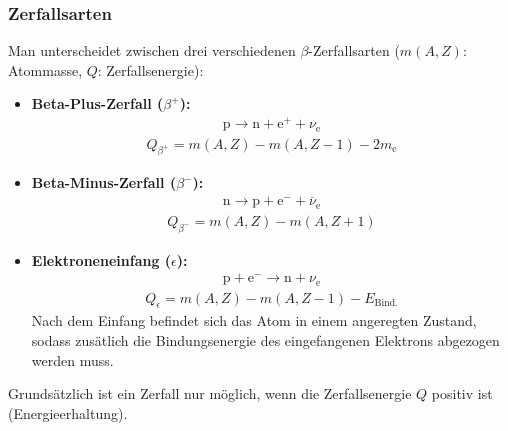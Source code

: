 \documentclass[11pt, a4paper]{article}
\numberwithin{equation}{section}
\begin{document}
\subsubsection{Zerfallsarten}
Man unterscheidet zwischen drei verschiedenen $\beta$-Zerfallsarten ($m(A,Z)$: Atommasse, $Q$: Zerfallsenergie):
\begin{itemize}
	\item \textbf{Beta-Plus-Zerfall ($\beta^+$):}
	\begin{align}
	\mathrm{p} \to \mathrm{n} + \mathrm{e}^+ + \nu_\mathrm{e}
	\end{align}
	\begin{align}
		Q_{\beta^+} = m( A, Z ) - m( A, Z - 1) - 2 m_\mathrm{e}
	\end{align}
	
	\item \textbf{Beta-Minus-Zerfall ($\beta^-$):}
	\begin{align}
	\mathrm{n} \to \mathrm{p} + \mathrm{e}^- + \overline{\nu}_\mathrm{e}
	\end{align}
	\begin{align}
	Q_{\beta^-} = m( A, Z ) - m( A, Z + 1)
	\end{align}
	
	\item \textbf{Elektroneneinfang ($\epsilon$):}
	\begin{align}
	\mathrm{p} + \mathrm{e}^- \to \mathrm{n} + \nu_\mathrm{e}
	\end{align}
	\begin{align}
	Q_{\epsilon} = m( A, Z ) - m( A, Z - 1) - E_\mathrm{Bind.}
	\end{align}
	Nach dem Einfang befindet sich das Atom in einem angeregten Zustand, sodass zusätlich die Bindungsenergie des eingefangenen Elektrons abgezogen werden muss.
\end{itemize}
Grundsätzlich ist ein Zerfall nur möglich, wenn die Zerfallsenergie $Q$ positiv ist (Energieerhaltung).
\end{document}
